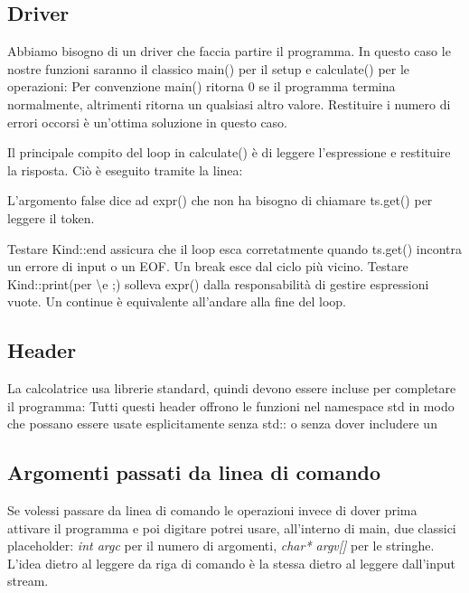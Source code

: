 \documentclass[11pt,a4paper]{book}
\begin{document}
\subsection{Driver}
Abbiamo bisogno di un driver che faccia partire il programma. In questo caso le nostre funzioni saranno il classico main() per il setup e calculate() per le operazioni:
\label{code: 143}
Per convenzione main() ritorna 0 se il programma termina normalmente, altrimenti ritorna un qualsiasi altro valore. Restituire i numero di errori occorsi è un'ottima soluzione in questo caso.

Il principale compito del loop in calculate() è di leggere l'espressione e restituire la risposta. Ciò è eseguito tramite la linea:
\label{code: 144}

L'argomento false dice ad expr() che non ha bisogno di chiamare ts.get() per leggere il token.

Testare Kind::end assicura che il loop esca corretatmente quando ts.get() incontra un errore di input o un EOF. Un break esce dal ciclo più vicino. Testare Kind::print(per \textbackslash e ;) solleva expr() dalla responsabilità di gestire espressioni vuote. Un continue è equivalente all'andare alla fine del loop.

\subsection{Header}
La calcolatrice usa librerie standard, quindi devono essere incluse per completare il programma:
\label{code: 145}
Tutti questi header offrono le funzioni nel namespace std in modo che possano essere usate esplicitamente senza std:: o senza dover includere un
\label{code: 146}

\subsection{Argomenti passati da linea di comando}
Se volessi passare da linea di comando le operazioni invece di dover prima attivare il programma e poi digitare potrei usare, all'interno di main, due classici placeholder: \emph{int argc} per il numero di argomenti, \emph{char* argv[]} per le stringhe. L'idea dietro al leggere da riga di comando è la stessa dietro al leggere dall'input stream.
\label{code: 147}
\end{document}
